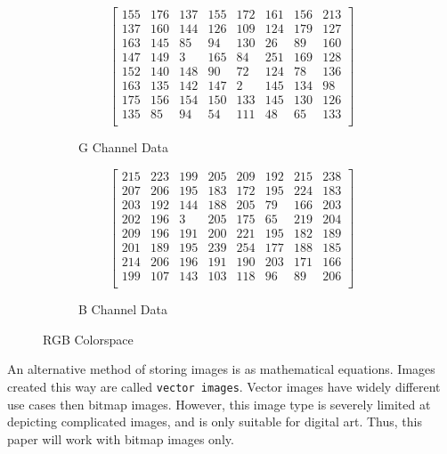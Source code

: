 \documentclass{article}
\begin{document}
\begin{figure}[h]
\begin{subfigure}{0.5\textwidth}
\begin{equation*}
\begin{bmatrix}
	155 & 176 & 137 & 155 & 172 & 161 & 156 & 213 \\
	137 & 160 & 144 & 126 & 109 & 124 & 179 & 127 \\
	163 & 145 &  85 &  94 & 130 &  26 &  89 & 160 \\
	147 & 149 &   3 & 165 &  84 & 251 & 169 & 128 \\
	152 & 140 & 148 &  90 &  72 & 124 &  78 & 136 \\
	163 & 135 & 142 & 147 &   2 & 145 & 134 &  98 \\
	175 & 156 & 154 & 150 & 133 & 145 & 130 & 126 \\
	135 &  85 &  94 &  54 & 111 &  48 &  65 & 133 \\
\end{bmatrix}
\end{equation*}
\caption{G Channel Data}
\end{subfigure}
\begin{subfigure}{0.5\textwidth}
\begin{equation*}
\begin{bmatrix}
	215 & 223 & 199 & 205 & 209 & 192 & 215 & 238 \\
	207 & 206 & 195 & 183 & 172 & 195 & 224 & 183 \\
	203 & 192 & 144 & 188 & 205 &  79 & 166 & 203 \\
	202 & 196 &   3 & 205 & 175 &  65 & 219 & 204 \\
	209 & 196 & 191 & 200 & 221 & 195 & 182 & 189 \\
	201 & 189 & 195 & 239 & 254 & 177 & 188 & 185 \\
	214 & 206 & 196 & 191 & 190 & 203 & 171 & 166 \\
	199 & 107 & 143 & 103 & 118 &  96 &  89 & 206 \\
\end{bmatrix}
\end{equation*}
\caption{B Channel Data}
\end{subfigure}
\caption{RGB Colorspace}
\end{figure}

An alternative method of storing images is as mathematical equations.
Images created this way are called \texttt{vector images}.
Vector images have widely different use cases then bitmap images.
However, this image type is severely limited at depicting complicated images, and is only suitable for digital art.
Thus, this paper will work with bitmap images only.
\end{document}
